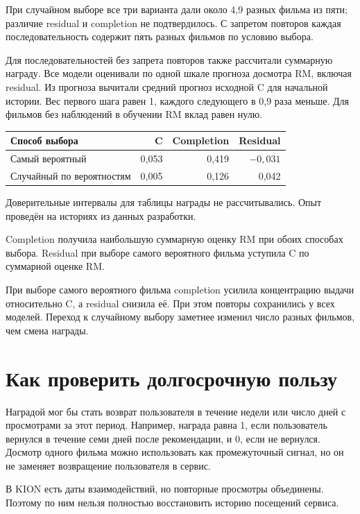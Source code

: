 \documentclass[11pt,a4paper]{article}
\begin{document}
При случайном выборе все три варианта дали около 4,9 разных фильма из пяти; различие residual и completion не подтвердилось. С запретом повторов каждая последовательность содержит пять разных фильмов по условию выбора.

Для последовательностей без запрета повторов также рассчитали суммарную награду. Все модели оценивали по одной шкале прогноза досмотра RM, включая residual. Из прогноза вычитали средний прогноз исходной C для начальной истории. Вес первого шага равен 1, каждого следующего в 0,9 раза меньше. Для фильмов без наблюдений в обучении RM вклад равен нулю.

\begin{center}
\begin{tabular}{lrrr}
\toprule
Способ выбора & C & Completion & Residual \\
\midrule
Самый вероятный & 0,053 & 0,419 & $-0,031$ \\
Случайный по вероятностям & 0,005 & 0,126 & 0,042 \\
\bottomrule
\end{tabular}
\end{center}

Доверительные интервалы для таблицы награды не рассчитывались. Опыт проведён на историях из данных разработки.

Completion получила наибольшую суммарную оценку RM при обоих способах выбора. Residual при выборе самого вероятного фильма уступила C по суммарной оценке RM.

При выборе самого вероятного фильма completion усилила концентрацию выдачи относительно C, а residual снизила её. При этом повторы сохранились у всех моделей. Переход к случайному выбору заметнее изменил число разных фильмов, чем смена награды.

\section{Как проверить долгосрочную пользу}

Наградой мог бы стать возврат пользователя в течение недели или число дней с просмотрами за этот период. Например, награда равна 1, если пользователь вернулся в течение семи дней после рекомендации, и 0, если не вернулся. Досмотр одного фильма можно использовать как промежуточный сигнал, но он не заменяет возвращение пользователя в сервис.

В KION есть даты взаимодействий, но повторные просмотры объединены. Поэтому по ним нельзя полностью восстановить историю посещений сервиса.
\end{document}
